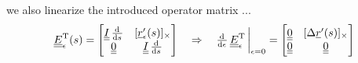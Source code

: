 \begin{frame}
  \vspace{1em}
  we also linearize the introduced operator matrix ...
  \begin{displaymath}
    \doubleunderline{E}_{\epsilon}^{\mathrm{T}}(s) =
    \begin{bmatrix}
      \doubleunderline{I} \, \od{}{s} & [ \underline{r}_{\epsilon}^{\prime}(s) ]_{\times} \\
      \doubleunderline{0}             & \doubleunderline{I} \, \od{}{s}
    \end{bmatrix}
  \quad \Rightarrow \quad
    \od{}{\epsilon} \, \doubleunderline{E}_{\epsilon}^{\mathrm{T}} \sVert[3]_{\epsilon=0} =
    \begin{bmatrix}
      \doubleunderline{0} & [ \Delta \underline{r}^{\prime}(s) ]_{\times} \\
      \doubleunderline{0} & \doubleunderline{0}
    \end{bmatrix}
  \end{displaymath}
  
\end{frame}


